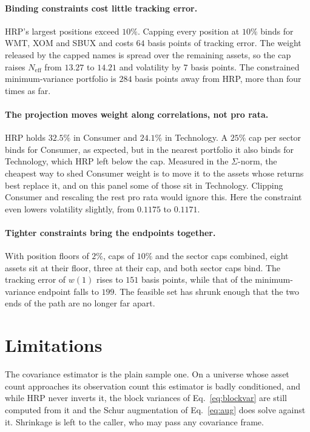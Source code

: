 \documentclass[11pt,a4paper]{article}
\begin{document}
\paragraph{Binding constraints cost little tracking error.}
HRP's largest positions exceed $10\%$. Capping every position at $10\%$ binds
for WMT, XOM and SBUX and costs $64$ basis points of tracking error. The
weight released by the capped names is spread over the remaining assets, so
the cap raises $N_{\mathrm{eff}}$ from $13.27$ to $14.21$ and volatility by
$7$ basis points. The constrained minimum-variance portfolio is $284$ basis
points away from HRP, more than four times as far.

\paragraph{The projection moves weight along correlations, not pro rata.}
HRP holds $32.5\%$ in Consumer and $24.1\%$ in Technology. A $25\%$ cap per
sector binds for Consumer, as expected, but in the nearest portfolio it also
binds for Technology, which HRP left below the cap. Measured in the
$\Sigma$-norm, the cheapest way to shed Consumer weight is to move it to the
assets whose returns best replace it, and on this panel some of those sit in
Technology. Clipping Consumer and rescaling the rest pro rata would ignore
this. Here the constraint even lowers volatility slightly, from $0.1175$ to
$0.1171$.

\paragraph{Tighter constraints bring the endpoints together.}
With position floors of $2\%$, caps of $10\%$ and the sector caps combined,
eight assets sit at their floor, three at their cap, and both sector caps
bind. The tracking error of $w(1)$ rises to $151$ basis points, while that of
the minimum-variance endpoint falls to $199$. The feasible set has shrunk enough that the two ends of the path are no longer
far apart.

\section{Limitations}

The covariance estimator is the plain sample one. On a universe whose asset
count approaches its observation count this estimator is badly conditioned, and
while HRP never inverts it, the block variances of Eq.~\eqref{eq:blockvar} are
still computed from it and the Schur augmentation of Eq.~\eqref{eq:aug} does
solve against it. Shrinkage \citep{ledoit2004} is left to the caller, who may
pass any covariance frame.
\end{document}
